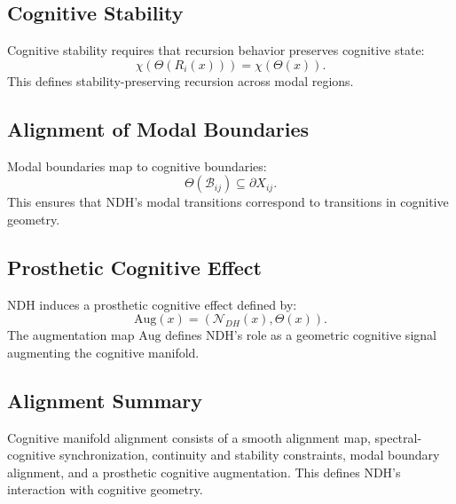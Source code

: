 \subsection{Cognitive Stability}

Cognitive stability requires that recursion behavior preserves cognitive state:
\[
\chi(\Theta(R_i(x))) = \chi(\Theta(x)).
\]
This defines stability-preserving recursion across modal regions.

\subsection{Alignment of Modal Boundaries}

Modal boundaries map to cognitive boundaries:
\[
\Theta(\mathcal{B}_{ij}) \subseteq \partial X_{ij}.
\]
This ensures that NDH's modal transitions correspond to transitions in cognitive
geometry.

\subsection{Prosthetic Cognitive Effect}

NDH induces a prosthetic cognitive effect defined by:
\[
\text{Aug}(x) = (\mathcal{N}_{DH}(x), \Theta(x)).
\]
The augmentation map $\text{Aug}$ defines NDH's role as a geometric cognitive
signal augmenting the cognitive manifold.

\subsection{Alignment Summary}

Cognitive manifold alignment consists of a smooth alignment map, spectral-cognitive
synchronization, continuity and stability constraints, modal boundary alignment,
and a prosthetic cognitive augmentation. This defines NDH's interaction with
cognitive geometry.
